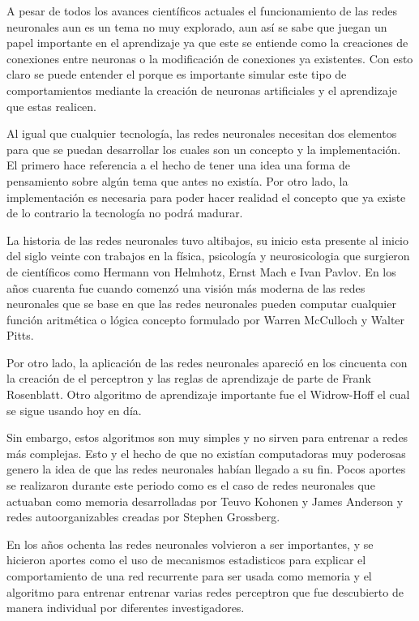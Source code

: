 \documentclass{article}
\begin{document}
A pesar de todos los avances científicos actuales el funcionamiento de las redes neuronales aun es un tema no muy explorado, aun así se sabe que juegan un papel importante en el aprendizaje ya que este se entiende como la creaciones de conexiones entre neuronas o la modificación de conexiones ya existentes. Con esto claro se puede entender el porque es importante simular este tipo de comportamientos mediante la creación de neuronas artificiales y el aprendizaje que estas realicen.

Al igual que cualquier tecnología, las redes neuronales necesitan dos elementos para que se puedan desarrollar los cuales son un concepto y la implementación. El primero hace referencia a el hecho de tener una idea una forma de pensamiento sobre algún tema que antes no existía. Por otro lado, la implementación es necesaria para poder hacer realidad el concepto que ya existe de lo contrario la tecnología no podrá madurar.

La historia de las redes neuronales tuvo altibajos, su inicio esta presente al inicio del siglo veinte con trabajos en la física, psicología y neurosicologia que surgieron de científicos como Hermann von Helmhotz, Ernst Mach e Ivan Pavlov. En los años cuarenta fue cuando comenzó una visión más moderna de las redes neuronales que se base en que las redes neuronales pueden computar cualquier función aritmética o lógica concepto formulado por Warren McCulloch y Walter Pitts.

Por otro lado, la aplicación de las redes neuronales apareció en los cincuenta con la creación de el perceptron y las reglas de aprendizaje de parte de Frank Rosenblatt. Otro algoritmo de aprendizaje importante fue el Widrow-Hoff el cual se sigue usando hoy en día. 

Sin embargo, estos algoritmos son muy simples y no sirven para entrenar a redes más complejas. Esto y el hecho de que no existían computadoras muy poderosas genero la idea de que las redes neuronales habían llegado a su fin. Pocos aportes se realizaron durante este periodo como es el caso de redes neuronales que actuaban como memoria desarrolladas por Teuvo Kohonen y James Anderson y redes autoorganizables creadas por Stephen Grossberg.

En los años ochenta las redes neuronales volvieron a ser importantes, y se hicieron aportes como el uso de mecanismos estadisticos para explicar el comportamiento de una red recurrente para ser usada como memoria y el algoritmo para entrenar entrenar varias redes perceptron que fue descubierto de manera individual por diferentes investigadores.
\end{document}
